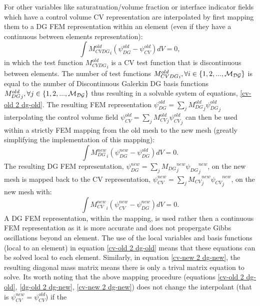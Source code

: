 For other variables like saturatuation/volume fraction or interface indicator fields which 
have a control volume CV representation are interpolated by first mapping them to 
a DG FEM representation within an element (even if they have a continuous between 
elements representation): 
\begin{equation}
\int {M_{CVDG}^{old}}_i (\psi_{DG}^{old} - \psi_{CV}^{old} ) dV =0, 
\label{cv-old 2 dg-old}
\end{equation}
in which the test function ${M_{CVDG}^{old}}_i$ is a CV test function that is discontinuous between elements. 
The number of test functions ${M_{CVDG}^{old}}_i, \forall i \in\{1,2,...,{\cal{M}_{DG}} \}$ is equal to the number of 
Discontinuous Galerkin DG basis functions ${M_{DG}^{old}}_j, \forall j \in\{1,2,...,{\cal{M}_{DG}} \}$ thus resulting in a solvable system 
of equations, \ref{cv-old 2 dg-old}. 
The resulting FEM representation $\psi_{DG}^{old} =\sum_j {M_{DG}^{old}}_j {\psi_{DG}^{old}}_j$ interpolating 
the control volume field $\psi_{CV}^{old} =\sum_j {M_{CV}^{old}}_j {\psi_{CV}^{old}}_j$  can 
then be used within a strictly FEM mapping from the old mesh to the new mesh (greatly simplifying  
the implementation of this mapping): 
\begin{equation}
\int {M_{DG}^{new}}_i (\psi_{DG}^{new} - \psi_{DG}^{old} ) dV =0. 
\label{dg-old 2 dg-new}
\end{equation}
The resulting DG FEM representation, $\psi_{DG}^{new}=\sum_j {M_{DG}}^{new}_j {\psi_{DG}}_j^{new}$, on the new mesh 
is mapped back to the CV representation,  
$\psi_{CV}^{new}=\sum_j {M_{CV}}^{new}_j {\psi_{CV}}_j^{new}$, 
on the new mesh with: 
\begin{equation}
\int {M_{CV}^{new}}_i (\psi_{CV}^{new} - \psi_{DG}^{new} ) dV =0. 
\label{cv-new 2 dg-new}
\end{equation}
A DG FEM representation, within the mapping, is used 
rather then a continuous FEM representation as it is more accurate and does not 
propergate Gibbs oscillations beyond an element. The use of the local variables and basis 
functions (local to an element) in equation \ref{cv-old 2 dg-old} means that these equations can be solved local to each element. 
Similarly, in equation \ref{cv-new 2 dg-new}, the resulting diagonal mass matrix means there is only a trival 
matrix equation to solve. 
Its worth noting that the above mapping procedure (equations \ref{cv-old 2 dg-old}, \ref{dg-old 2 dg-new}, \ref{cv-new 2 dg-new}) does not change the interpolant (that is $\psi_{CV}^{new} = \psi_{CV}^{old}$) if the 
